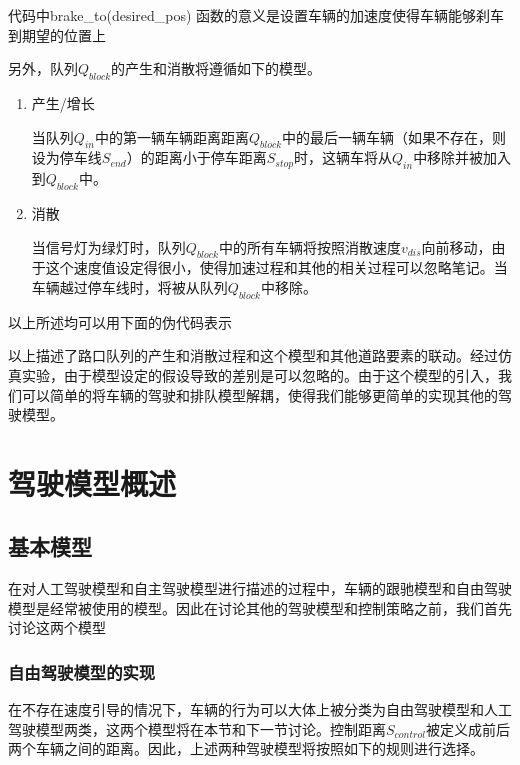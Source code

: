 \documentclass[a4paper,UTF8]{paper}
\begin{document}


代码中brake\_to(desired\_pos) 函数的意义是设置车辆的加速度使得车辆能够刹车到期望的位置上

另外，队列$Q_{block}$的产生和消散将遵循如下的模型。

\begin{enumerate}
\item 产生/增长

当队列$Q_{in}$中的第一辆车辆距离距离$Q_{block}$中的最后一辆车辆（如果不存在，则设为停车线$S_{end}$）的距离小于停车距离$S_{stop}$时，这辆车将从$Q_{in}$中移除并被加入到$Q_{block}$中。

\item 消散

当信号灯为绿灯时，队列$Q_{block}$中的所有车辆将按照消散速度$v_{dis}$向前移动，由于这个速度值设定得很小，使得加速过程和其他的相关过程可以忽略笔记。当车辆越过停车线时，将被从队列$Q_{block}$中移除。

\end{enumerate}

以上所述均可以用下面的伪代码表示



以上描述了路口队列的产生和消散过程和这个模型和其他道路要素的联动。经过仿真实验，由于模型设定的假设导致的差别是可以忽略的。由于这个模型的引入，我们可以简单的将车辆的驾驶和排队模型解耦，使得我们能够更简单的实现其他的驾驶模型。

\section{驾驶模型概述}
\subsection{基本模型}

在对人工驾驶模型和自主驾驶模型进行描述的过程中，车辆的跟驰模型和自由驾驶模型是经常被使用的模型。因此在讨论其他的驾驶模型和控制策略之前，我们首先讨论这两个模型

\subsubsection{自由驾驶模型的实现}

在不存在速度引导的情况下，车辆的行为可以大体上被分类为自由驾驶模型和人工驾驶模型两类，这两个模型将在本节和下一节讨论。控制距离$S_{control}$被定义成前后两个车辆之间的距离。因此，上述两种驾驶模型将按照如下的规则进行选择。
\end{document}
